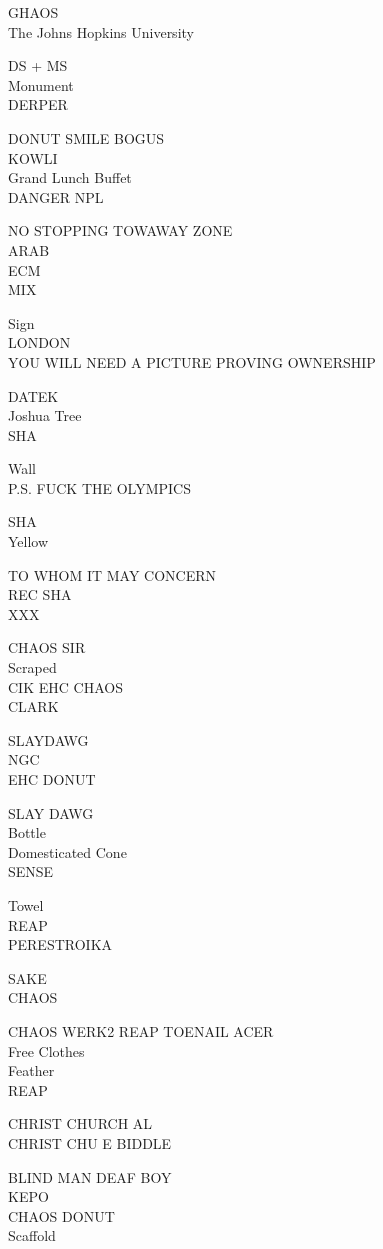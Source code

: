 \documentclass[10pt,letterpaper]{article}
\begin{document}
GHAOS\\
The Johns Hopkins University

DS + MS\\
Monument\\
DERPER

DONUT SMILE BOGUS\\
KOWLI\\
Grand Lunch Buffet\\
DANGER NPL

NO STOPPING TOWAWAY ZONE\\
ARAB\\
ECM\\
MIX

Sign\\
LONDON\\
YOU WILL NEED A PICTURE PROVING OWNERSHIP

DATEK\\
Joshua Tree\\
SHA

Wall\\
P.S. FUCK THE OLYMPICS

SHA\\
Yellow

TO WHOM IT MAY CONCERN\\
REC SHA\\
XXX

CHAOS SIR\\
Scraped\\
CIK EHC CHAOS\\
CLARK

SLAYDAWG\\
NGC\\
EHC DONUT

SLAY DAWG\\
Bottle\\
Domesticated Cone\\
SENSE

Towel\\
REAP\\
PERESTROIKA

SAKE\\
CHAOS

CHAOS WERK2 REAP TOENAIL ACER\\
Free Clothes\\
Feather\\
REAP

CHRIST CHURCH AL\\
CHRIST CHU E BIDDLE

BLIND MAN DEAF BOY\\
KEPO\\
CHAOS DONUT\\
Scaffold
\end{document}
